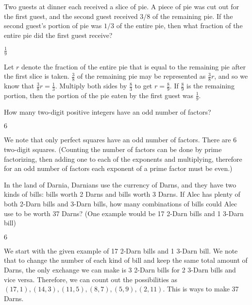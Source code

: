 \documentclass[11pt]{article}
\begin{document}
\begin{problem} %
Two guests at dinner each received a slice of pie. A piece of pie was cut out for the first guest, and the second guest received $3/8$ of the remaining pie. If the second guest’s portion of pie was $1/3$ of the entire pie, then what fraction of the entire pie did the first guest receive?
\end{problem}
\begin{answer}
$\boxed{\frac{1}{9}}$
\end{answer}
\begin{solution}
Let $r$ denote the fraction of the entire pie that is equal to the remaining pie after the first slice is taken. $\frac{3}{8}$ of the remaining pie may be represented as $\frac{3}{8}r$, and so we know that $\frac{3}{8}r = \frac{1}{3}$. Multiply both sides by $\frac{8}{3}$ to get $r = \frac{8}{9}$. If $\frac{8}{9}$ is the remaining portion, then the portion of the pie eaten by the first guest was $\boxed{\frac{1}{9}}$.
\end{solution}

\begin{problem} %
How many two-digit positive integers have an odd number of factors?
\end{problem}
\begin{answer}
$\boxed{6}$
\end{answer}
\begin{solution}
We note that only perfect squares have an odd number of factors. There are 6 two-digit squares. (Counting the number of factors can be done by prime factorizing, then adding one to each of the exponents and multiplying, therefore for an odd number of factors each exponent of a prime factor must be even.)
\end{solution}

\begin{problem} %
In the land of Darnia, Darnians use the currency of Darns, and they have two kinds of bills: bills worth 2 Darns and bills worth 3 Darns. If Alec has plenty of both 2-Darn bills and 3-Darn bills, how many combinations of bills could Alec use to be worth 37 Darns? (One example would be 17 2-Darn bills and 1 3-Darn bill)
\end{problem}
\begin{answer}
$\boxed{6}$
\end{answer}
\begin{solution} We start with the given example of 17 2-Darn bills and 1 3-Darn bill. We note that to change the number of each kind of bill and keep the same total amount of Darns, the only exchange we can make is 3 2-Darn bills for 2 3-Darn bills and vice versa. Therefore, we can count out the possibilities as $(17, 1), (14, 3), (11, 5), (8, 7), (5, 9), (2, 11)$. This is  ways to make 37 Darns.
\end{solution}
\end{document}
